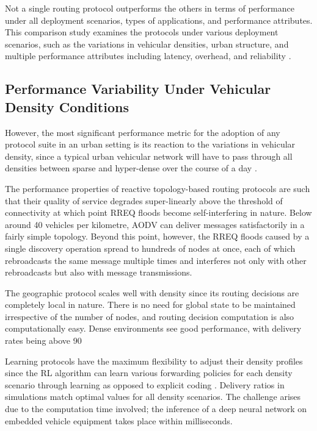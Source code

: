 \documentclass[12pt]{article}
\begin{document}
Not a single routing protocol outperforms the others in terms of performance under all deployment scenarios, types of applications, and performance attributes. This comparison study examines the protocols under various deployment scenarios, such as the variations in vehicular densities, urban structure, and multiple performance attributes including latency, overhead, and reliability \cite{boukerche2011routing}.

\subsection{Performance Variability Under Vehicular Density Conditions}

However, the most significant performance metric for the adoption of any protocol suite in an urban setting is its reaction to the variations in vehicular density, since a typical urban vehicular network will have to pass through all densities between sparse and hyper-dense over the course of a day \cite{li2007routing}.

The performance properties of reactive topology-based routing protocols are such that their quality of service degrades super-linearly above the threshold of connectivity at which point RREQ floods become self-interfering in nature. Below around 40 vehicles per kilometre, AODV can deliver messages satisfactorily in a fairly simple topology. Beyond this point, however, the RREQ floods caused by a single discovery operation spread to hundreds of nodes at once, each of which rebroadcasts the same message multiple times and interferes not only with other rebroadcasts but also with message transmissions.

The geographic protocol scales well with density since its routing decisions are completely local in nature. There is no need for global state to be maintained irrespective of the number of nodes, and routing decision computation is also computationally easy. Dense environments see good performance, with delivery rates being above 90%

Learning protocols have the maximum flexibility to adjust their density profiles since the RL algorithm can learn various forwarding policies for each density scenario through learning as opposed to explicit coding \cite{wang2020deep}. Delivery ratios in simulations match optimal values for all density scenarios. The challenge arises due to the computation time involved; the inference of a deep neural network on embedded vehicle equipment takes place within milliseconds.
\end{document}
